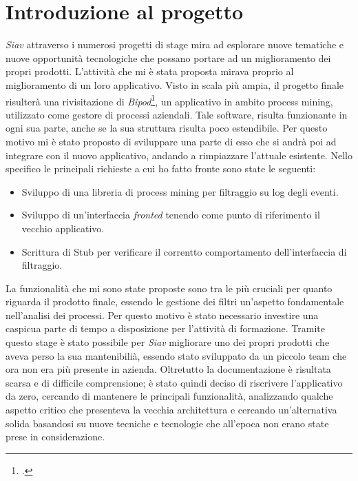 \section{Introduzione al progetto}
\textit{Siav} attraverso i numerosi progetti di stage mira ad esplorare nuove tematiche e nuove opportunità tecnologiche che possano portare ad un miglioramento dei propri prodotti. L'attività che mi è stata proposta mirava proprio al miglioramento di un loro applicativo. Visto in scala più ampia, il progetto finale risulterà una rivisitazione di \textit{Bipod}\footcite{Bipod: https://www.siav.com/it/soluzioni-software/bipod-applicativo-process-mining/}, un applicativo in ambito process mining, utilizzato come gestore di processi aziendali.
Tale software, risulta funzionante in ogni sua parte, anche se la sua struttura risulta poco estendibile. Per questo motivo mi è stato proposto di sviluppare una parte di esso che si andrà poi ad integrare con il nuovo applicativo, andando a rimpiazzare l'attuale esistente.
Nello specifico le principali richieste a cui ho fatto fronte sono state le seguenti:
\begin{itemize}
	\item Sviluppo di una libreria di process mining per filtraggio su log degli eventi.
	\item Sviluppo di un'interfaccia \textit{fronted} tenendo come punto di riferimento il vecchio applicativo.
	\item Scrittura di Stub per verificare il correntto comportamento dell'interfaccia di filtraggio.
\end{itemize}
La funzionalità che mi sono state proposte sono tra le più cruciali per quanto riguarda il prodotto finale, essendo le gestione dei filtri un'aspetto fondamentale nell'analisi dei processi. Per questo motivo è stato necessario investire una caspicua parte di tempo a disposizione per l'attività di formazione.
Tramite questo stage è stato possibile per \textit{Siav} migliorare uno dei propri prodotti che aveva perso la sua mantenibilià, essendo stato sviluppato da un piccolo team che ora non era più presente in azienda. Oltretutto la documentazione è risultata scarsa e di difficile comprensione; è stato quindi deciso di riscrivere l'applicativo da zero, cercando di mantenere le principali funzionalità, analizzando qualche aspetto critico che presenteva la vecchia architettura e cercando un'alternativa solida basandosi su nuove tecniche e tecnologie che all'epoca non erano state prese in considerazione. 
